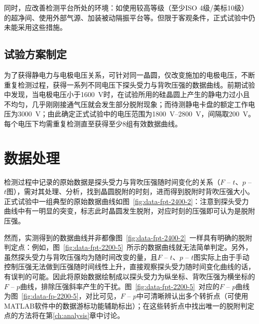 同时，应改善检测平台所处的环境：如使用较高等级（至少ISO 4级/美标10级）的超净间、使用外部气源、加装被动隔振平台等。但限于客观条件，正式试验中仍未能采用这些措施。


\subsection{试验方案制定}\label{sec:exp-main-plan}

为了获得静电力与电极电压关系，可针对同一晶圆，仅改变施加的电极电压，不断重复检测过程，获得一系列不同电压下探头受力与背吹压强的数据曲线。前期试验中发现，当电极电压小于\SI{1600}{\V}时，在试验所用的硅晶圆上产生的静电力过小且不均匀，几乎刚刚接通气压就会发生部分脱附现象；而待测静电卡盘的额定工作电压为\SI{3000}{\V}；由此确定正式试验中的电压范围为\SIrange{1800}{2800}{\V}，间隔取\SI{200}{\V}。每个电压下均需重复检测直至获得至少8组有效数据曲线。



\section{数据处理}\label{sec:exp-data}

检测过程中记录的原始数据是探头受力与背吹压强随时间变化的关系（$F$ -- $t$、$p$ -- $t$图），需对其处理、分析，找到晶圆脱附的时刻，进而得到脱附时背吹压强大小。正式试验中一组典型的原始数据曲线如图~\ref{fig:data-fpt-2400-2}：注意到探头受力曲线中有一明显的突变，标志此时晶圆发生脱附，对应时刻的压强即可认为是脱附压强。

然而，实测得到的数据曲线并非都像图~\ref{fig:data-fpt-2400-2}~一样具有明确的脱附判定点：例如，图~\ref{fig:data-fpt-2200-5}~所示的数据曲线就无法简单判定。另外，虽然探头受力与背吹压强均为随时间改变的量，且$F$ -- $t$、$p$ -- $t$图实际上由于手动控制压强无法做到压强随时间线性上升，直接观察探头受力随时间变化曲线的话，有误判的可能。因此将原始数据绘制成以探头受力为纵坐标、背吹压强为横坐标的$F$ -- $p$曲线，排除压强斜率产生的干扰。图~\ref{fig:data-fpt-2200-5}~对应的$F$ -- $p$曲线为图~\ref{fig:data-fp-2200-5}，对比可见，$F$ -- $p$中可清晰辨认出多个转折点（可使用MATLAB软件中的数据游标功能辅助标出）；在这些转折点中找出唯一的脱附判定点的方法将在第\ref{ch:analysis}章中讨论。


